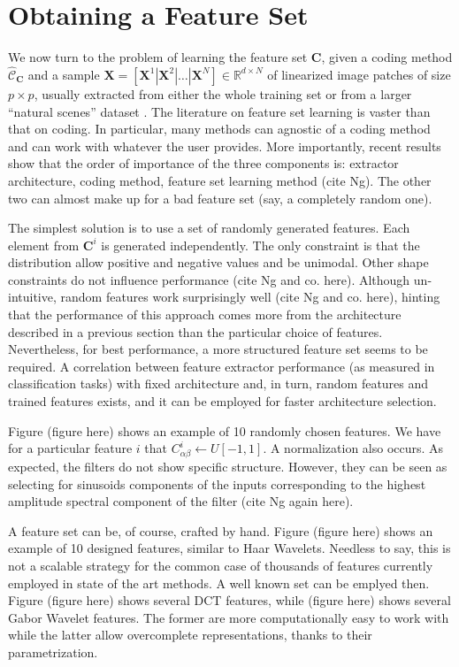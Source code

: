 \documentclass[12pt,a4paper,oneside,english]{UPBThesis}
\newcommand{\hctimes}[2]{{#1}\!\times\!{#2}}
\begin{document}
\chapter{Obtaining a Feature Set}

We now turn to the problem of learning the feature set $\textbf{C}$, given a coding method $\hat{\mathcal{C}}_\textbf{C}$ and a sample $\textbf{X} = \left[ \textbf{X}^1 \left|\right. \textbf{X}^2 \left|\right. \dots \left|\right. \textbf{X}^N \right] \in \mathbb{R}^{\hctimes{d}{N}}$ of linearized image patches of size $\hctimes{p}{p}$, usually extracted from either the whole training set or from a larger ``natural scenes'' dataset \cite{self-taught-learning}. The literature on feature set learning is vaster than that on coding. In particular, many methods can agnostic of a coding method and can work with whatever the user provides. More importantly, recent results show that the order of importance of the three components is: extractor architecture, coding method, feature set learning method (cite Ng). The other two can almost make up for a bad feature set (say, a completely random one).

The simplest solution is to use a set of randomly generated features. Each element from $\textbf{C}^i$ is generated independently. The only constraint is that the distribution allow positive and negative values and be unimodal. Other shape constraints do not influence performance (cite Ng and co. here). Although un-intuitive, random features work surprisingly well (cite Ng and co. here), hinting that the performance of this approach comes more from the architecture described in a previous section than the particular choice of features. Nevertheless, for best performance, a more structured feature set seems to be required. A correlation between feature extractor performance (as measured in classification tasks) with fixed architecture and, in turn, random features and trained features exists, and it can be employed for faster architecture selection.

Figure (figure here) shows an example of 10 randomly chosen features. We have for a particular feature $i$ that $C^i_{\alpha\beta} \leftarrow U[-1,1]$. A normalization also occurs. As expected, the filters do not show specific structure. However, they can be seen as selecting for sinusoids components of the inputs corresponding to the highest amplitude spectral component of the filter (cite Ng again here).

A feature set can be, of course, crafted by hand. Figure (figure here) shows an example of 10 designed features, similar to Haar Wavelets. Needless to say, this is not a scalable strategy for the common case of thousands of features currently employed in state of the art methods. A well known set can be emplyed then. Figure (figure here) shows several DCT features, while (figure here) shows several Gabor Wavelet features. The former are more computationally easy to work with while the latter allow overcomplete representations, thanks to their parametrization.
\end{document}
